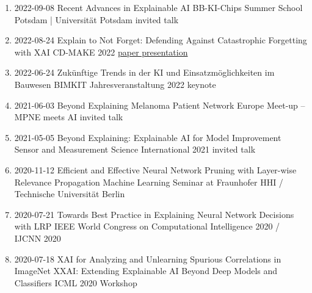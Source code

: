 \documentclass[10pt,a4paper]{article} %
\begin{document}
{
\begin{enumerate}
    \item {}
                    {2022-09-08}
                    {Recent Advances in Explainable AI}
                    {BB-KI-Chips Summer School Potsdam | Universität Potsdam}
                    {invited talk}
    \item {}
                    {2022-08-24}
                    {Explain to Not Forget: Defending Against Catastrophic Forgetting with XAI                    }
                    {CD-MAKE 2022}
                    {\href{https://link.springer.com/chapter/10.1007/978-3-031-14463-9_1}{paper presentation}}
    \item {}
                    {2022-06-24}
                    {Zukünftige Trends in der KI und Einsatzmöglichkeiten im Bauwesen}
                    {BIMKIT Jahresveranstaltung 2022}
                    {keynote}
    \item {}
                    {2021-06-03}
                    {Beyond Explaining}
                    {Melanoma Patient Network Europe Meet-up -- MPNE meets AI }
                    {invited talk}
    \item {}
                    {2021-05-05}
                    {Beyond Explaining: Explainable AI for Model Improvement}
                    {Sensor and Measurement Science International 2021}
                    {invited talk}
    \item {}
                    {2020-11-12}
                    {Efficient and Effective Neural Network Pruning with Layer-wise Relevance Propagation}
                    {Machine Learning Seminar at Fraunhofer HHI / Technische Universität Berlin}
    \item {}
                    {2020-07-21}
                    {Towards Best Practice in Explaining Neural Network Decisions with LRP}
                    {IEEE World Congress on Computational Intelligence 2020 / IJCNN 2020}
    \item {}
                    {2020-07-18}
                    {XAI for Analyzing and Unlearning Spurious Correlations in ImageNet}
                    {XXAI: Extending Explainable AI Beyond Deep Models and Classifiers}
                    {ICML 2020 Workshop}

\end{enumerate}}
\end{document}
